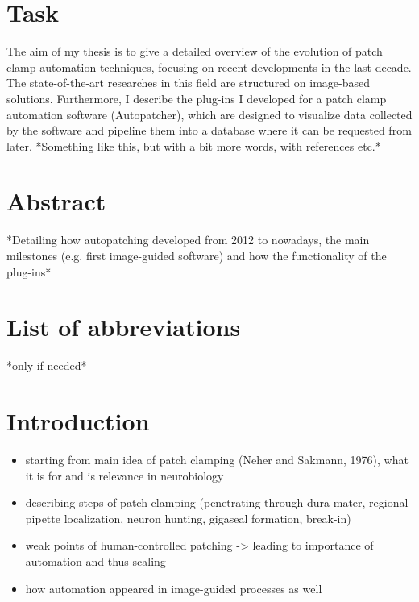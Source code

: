 \documentclass[12pt]{report}
\theoremstyle{definition}
\begin{document}
\chapter*{Task}

The aim of my thesis is to give a detailed overview of the evolution of patch clamp automation techniques, focusing on recent developments in the last decade. The state-of-the-art researches in this field are structured on image-based solutions. Furthermore, I describe the plug-ins I developed for a patch clamp automation software (Autopatcher), which are designed to visualize data collected by the software and pipeline them into a database where it can be requested from later.
*Something like this, but with a bit more words, with references etc.*


\chapter*{Abstract}

*Detailing how autopatching developed from 2012 to nowadays, the main milestones (e.g. first image-guided software) and how the functionality of the plug-ins*

\tableofcontents

\chapter*{List of abbreviations}

*only if needed*

\chapter*{Introduction}

\begin{itemize}
	\item starting from main idea of patch clamping (Neher and Sakmann, 1976), what it is for and is relevance in neurobiology
	\item describing steps of patch clamping (penetrating through dura mater, regional pipette localization, neuron hunting, gigaseal formation, break-in)
	\item weak points of human-controlled patching -> leading to importance of automation and thus scaling
	\item how automation appeared in image-guided processes as well
\end{itemize}
\end{document}
